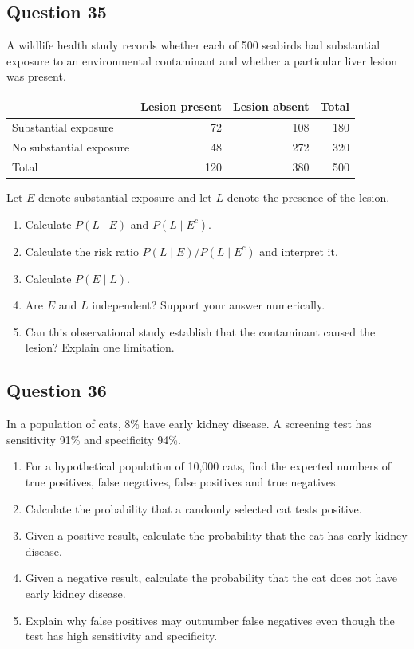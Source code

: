 \documentclass[10pt,letterpaper]{article}
\newcommand{\questionheading}[1]{%
  \subsection*{Question #1}
}
\begin{document}
\questionheading{35}
A wildlife health study records whether each of 500 seabirds had substantial exposure to an environmental contaminant and whether a particular liver lesion was present.
\begin{center}
\begin{tabular}{lrrr}
\toprule
 & Lesion present & Lesion absent & Total \\
\midrule
Substantial exposure & 72 & 108 & 180 \\
No substantial exposure & 48 & 272 & 320 \\
\midrule
Total & 120 & 380 & 500 \\
\bottomrule
\end{tabular}
\end{center}

Let $E$ denote substantial exposure and let $L$ denote the presence of the lesion.
\begin{enumerate}
	\item Calculate $P(L\mid E)$ and $P(L\mid E^c)$.
	\item Calculate the risk ratio $P(L\mid E)/P(L\mid E^c)$ and interpret it.
	\item Calculate $P(E\mid L)$.
	\item Are $E$ and $L$ independent? Support your answer numerically.
	\item Can this observational study establish that the contaminant caused the lesion? Explain one limitation.
\end{enumerate}

\newpage

\questionheading{36}
In a population of cats, 8\% have early kidney disease. A screening test has sensitivity 91\% and specificity 94\%.
\begin{enumerate}
	\item For a hypothetical population of 10,000 cats, find the expected numbers of true positives, false negatives, false positives and true negatives.
	\item Calculate the probability that a randomly selected cat tests positive.
	\item Given a positive result, calculate the probability that the cat has early kidney disease.
	\item Given a negative result, calculate the probability that the cat does not have early kidney disease.
	\item Explain why false positives may outnumber false negatives even though the test has high sensitivity and specificity.
\end{enumerate}
\end{document}
